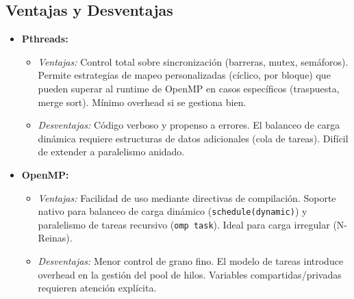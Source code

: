 \documentclass[11pt,a4paper]{article}
\begin{document}
\subsection*{Ventajas y Desventajas}
\begin{itemize}
    \item \textbf{Pthreads:}
    \begin{itemize}
        \item \textit{Ventajas:} Control total sobre sincronización (barreras, mutex, semáforos). Permite estrategias de mapeo personalizadas (cíclico, por bloque) que pueden superar al runtime de OpenMP en casos específicos (traspuesta, merge sort). Mínimo overhead si se gestiona bien.
        \item \textit{Desventajas:} Código verboso y propenso a errores. El balanceo de carga dinámica requiere estructuras de datos adicionales (cola de tareas). Difícil de extender a paralelismo anidado.
    \end{itemize}
    \item \textbf{OpenMP:}
    \begin{itemize}
        \item \textit{Ventajas:} Facilidad de uso mediante directivas de compilación. Soporte nativo para balanceo de carga dinámico (\texttt{schedule(dynamic)}) y paralelismo de tareas recursivo (\texttt{omp task}). Ideal para carga irregular (N-Reinas).
        \item \textit{Desventajas:} Menor control de grano fino. El modelo de tareas introduce overhead en la gestión del pool de hilos. Variables compartidas/privadas requieren atención explícita.
    \end{itemize}
\end{itemize}
\end{document}
